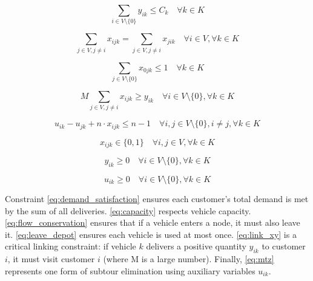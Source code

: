 \documentclass{article}
\begin{document}
\begin{equation}
\sum_{i \in V \setminus \{0\}} y_{ik} \leq C_k \quad \forall k \in K \label{eq:capacity}
\end{equation}

\begin{equation}
\sum_{j \in V, j \neq i} x_{ijk} = \sum_{j \in V, j \neq i} x_{jik} \quad \forall i \in V, \forall k \in K \label{eq:flow_conservation}
\end{equation}

\begin{equation}
\sum_{j \in V \setminus \{0\}} x_{0jk} \leq 1 \quad \forall k \in K \label{eq:leave_depot}
\end{equation}

\begin{equation}
M \sum_{j \in V, j \neq i} x_{ijk} \geq y_{ik} \quad \forall i \in V \setminus \{0\}, \forall k \in K \label{eq:link_xy}
\end{equation}

\begin{equation}
u_{ik} - u_{jk} + n \cdot x_{ijk} \leq n - 1 \quad \forall i, j \in V \setminus \{0\}, i \neq j, \forall k \in K \label{eq:mtz}
\end{equation}

\begin{equation}
x_{ijk} \in \{0, 1\} \quad \forall i, j \in V, \forall k \in K
\end{equation}

\begin{equation}
y_{ik} \geq 0 \quad \forall i \in V \setminus \{0\}, \forall k \in K
\end{equation}

\begin{equation}
u_{ik} \geq 0 \quad \forall i \in V \setminus \{0\}, \forall k \in K
\end{equation}

Constraint \eqref{eq:demand_satisfaction} ensures each customer's total demand is met by the sum of all deliveries. \eqref{eq:capacity} respects vehicle capacity. \eqref{eq:flow_conservation} ensures that if a vehicle enters a node, it must also leave it. \eqref{eq:leave_depot} ensures each vehicle is used at most once. \eqref{eq:link_xy} is a critical linking constraint: if vehicle $k$ delivers a positive quantity $y_{ik}$ to customer $i$, it must visit customer $i$ (where M is a large number). Finally, \eqref{eq:mtz} represents one form of subtour elimination using auxiliary variables $u_{ik}$.
\end{document}
